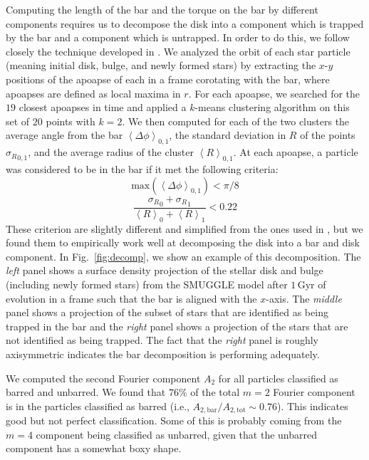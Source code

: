 \documentclass[fleqn,usenatbib]{mnras}
\begin{document}
Computing the length of the bar and the torque on the bar by different
components requires us to decompose the disk into a component which is trapped
by the bar and a component which is untrapped. In order to do this, we follow
closely the technique developed in \citet{2016MNRAS.463.1952P}. We analyzed the
orbit of each star particle (meaning initial disk, bulge, and newly formed
stars) by extracting the $x$-$y$ positions of the apoapse of each in a frame
corotating with the bar, where apoapses are defined as local maxima in $r$. For
each apoapse, we searched for the $19$ closest apoapses in time and applied a
$k$-means clustering algorithm on this set of $20$ points with $k=2$. We then
computed for each of the two clusters the average angle from the bar
$\left<\Delta \phi\right>_{0,1}$, the standard deviation in $R$ of the points
${\sigma_R}_{0,1}$, and the average radius of the cluster
$\left<R\right>_{0,1}$. At each apoapse, a particle was considered to be in the
bar if it met the following criteria:
\begin{equation}
\textrm{max}\left(\left<\Delta \phi\right>_{0,1}\right) < \pi / 8
\end{equation}
\begin{equation}
\frac{{\sigma_R}_0 + {\sigma_R}_1}{\left<R\right>_0 + \left<R\right>_1} < 0.22
\end{equation}
These criterion are slightly different and simplified from the ones used in
\citet{2016MNRAS.463.1952P}, but we found them to empirically work well at
decomposing the disk into a bar and disk component. In Fig.~\ref{fig:decomp}, we
show an example of this decomposition. The \textit{left} panel shows a surface
density projection of the stellar disk and bulge (including newly formed stars)
from the SMUGGLE model after $1\,\text{Gyr}$ of evolution in a frame such that
the bar is aligned with the $x$-axis. The \textit{middle} panel shows a
projection of the subset of stars that are identified as being trapped in the
bar and the \textit{right} panel shows a projection of the stars that are not
identified as being trapped. The fact that the \textit{right} panel is roughly
axisymmetric indicates the bar decomposition is performing adequately.

We computed the second Fourier component $A_2$ for all particles classified as
barred and unbarred. We found that $76\%$ of the total $m=2$ Fourier component
is in the particles classified as barred (i.e.,
$A_{2,\textrm{bar}}/A_{2,\textrm{tot}}\sim0.76$). This indicates good but not
perfect classification. Some of this is probably coming from the $m=4$ component
being classified as unbarred, given that the unbarred component has a somewhat
boxy shape.
\end{document}
